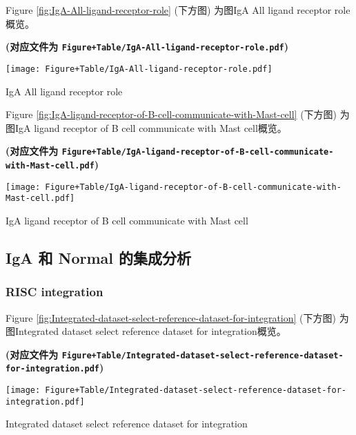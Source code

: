 \documentclass[
]{article}
\begin{document}
Figure \ref{fig:IgA-All-ligand-receptor-role} (下方图) 为图IgA All ligand receptor role概览。

\textbf{(对应文件为 \texttt{Figure+Table/IgA-All-ligand-receptor-role.pdf})}

\def\@captype{figure}
\begin{center}
\texttt{[image: Figure+Table/IgA-All-ligand-receptor-role.pdf]}
\caption{IgA All ligand receptor role}\label{fig:IgA-All-ligand-receptor-role}
\end{center}

Figure \ref{fig:IgA-ligand-receptor-of-B-cell-communicate-with-Mast-cell} (下方图) 为图IgA ligand receptor of B cell communicate with Mast cell概览。

\textbf{(对应文件为 \texttt{Figure+Table/IgA-ligand-receptor-of-B-cell-communicate-with-Mast-cell.pdf})}

\def\@captype{figure}
\begin{center}
\texttt{[image: Figure+Table/IgA-ligand-receptor-of-B-cell-communicate-with-Mast-cell.pdf]}
\caption{IgA ligand receptor of B cell communicate with Mast cell}\label{fig:IgA-ligand-receptor-of-B-cell-communicate-with-Mast-cell}
\end{center}

\hypertarget{iga-ux548c-normal-ux7684ux96c6ux6210ux5206ux6790-1}{%
\subsection{IgA 和 Normal 的集成分析}\label{iga-ux548c-normal-ux7684ux96c6ux6210ux5206ux6790-1}}

\hypertarget{risc-integration}{%
\subsubsection{RISC integration}\label{risc-integration}}

Figure \ref{fig:Integrated-dataset-select-reference-dataset-for-integration} (下方图) 为图Integrated dataset select reference dataset for integration概览。

\textbf{(对应文件为 \texttt{Figure+Table/Integrated-dataset-select-reference-dataset-for-integration.pdf})}

\def\@captype{figure}
\begin{center}
\texttt{[image: Figure+Table/Integrated-dataset-select-reference-dataset-for-integration.pdf]}
\caption{Integrated dataset select reference dataset for integration}\label{fig:Integrated-dataset-select-reference-dataset-for-integration}
\end{center}
\end{document}
